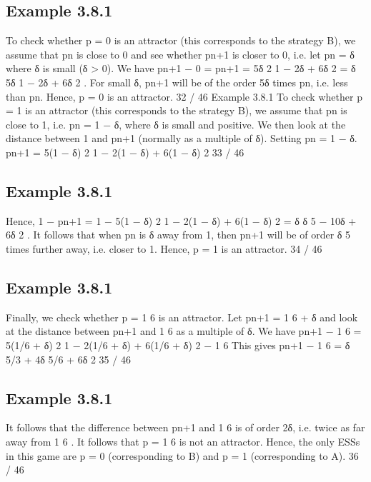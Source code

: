 \documentclass[]{report}
\begin{document}
\subsection{Example 3.8.1}
To check whether p = 0 is an attractor (this corresponds to the
strategy B), we assume that pn is close to 0 and see whether pn+1
is closer to 0, i.e. let pn = δ where δ is small (δ > 0).
We have
pn+1 − 0 = pn+1 =
5δ
2
1 − 2δ + 6δ
2
= δ
5δ
1 − 2δ + 6δ
2
.
For small δ, pn+1 will be of the order 5δ times pn, i.e. less than pn.
Hence, p = 0 is an attractor.
32 / 46
Example 3.8.1
To check whether p = 1 is an attractor (this corresponds to the
strategy B), we assume that pn is close to 1, i.e. pn = 1 − δ,
where δ is small and positive.
We then look at the distance between 1 and pn+1 (normally as a
multiple of δ). Setting pn = 1 − δ.
pn+1 =
5(1 − δ)
2
1 − 2(1 − δ) + 6(1 − δ)
2
33 / 46

\subsection{Example 3.8.1}
Hence,
1 − pn+1 = 1 −
5(1 − δ)
2
1 − 2(1 − δ) + 6(1 − δ)
2
= δ
δ
5 − 10δ + 6δ
2
.
It follows that when pn is δ away from 1, then pn+1 will be of order
δ
5
times further away, i.e. closer to 1.
Hence, p = 1 is an attractor.
34 / 46
\subsection{Example 3.8.1}
Finally, we check whether p =
1
6
is an attractor. Let pn+1 =
1
6 + δ
and look at the distance between pn+1 and 1
6
as a multiple of δ.
We have
pn+1 −
1
6
=
5(1/6 + δ)
2
1 − 2(1/6 + δ) + 6(1/6 + δ)
2
−
1
6
This gives
pn+1 −
1
6
= δ
5/3 + 4δ
5/6 + 6δ
2
35 / 46
\subsection{Example 3.8.1}
It follows that the difference between pn+1 and 1
6
is of order 2δ,
i.e. twice as far away from 1
6
.
It follows that p =
1
6
is not an attractor.
Hence, the only ESSs in this game are p = 0 (corresponding to B)
and p = 1 (corresponding to A).
36 / 46

\end{document}

